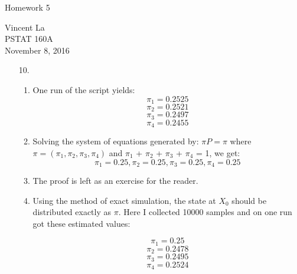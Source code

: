 \documentclass[11pt]{article}
\title{ }
\begin{document}
	\begin{center}	%
		\Large{Homework 5}	%
	\end{center}
	\begin{center}
		Vincent La \\
		PSTAT 160A \\
		November 8, 2016
	\end{center}

\begin{enumerate}

\item[10.]
	\begin{enumerate}
		\item One run of the script yields:
		\[\pi_1 =  0.2525\]
		\[\pi_2 = 0.2521\]
		\[\pi_3 = 0.2497\]
		\[\pi_4 = 0.2455\]
		\item Solving the system of equations generated by:
		$\pi P = \pi$ where $\pi = (\pi_1,\pi_2,\pi_3,\pi_4)$
		and $\pi_1$ + $\pi_2$ + $\pi_3$ + $\pi_4$ = 1, we get:
		\[\pi_1 = 0.25, \pi_2 = 0.25, \pi_3 = 0.25, \pi_4 = 0.25\]
		\item The proof is left as an exercise for the reader.
		\item Using the method of exact simulation, the state at $X_0$ should be distributed exactly as $\pi$. Here I collected 10000 samples and on one run got these estimated values:
	
		\[\pi_1 =  0.25\]
		\[\pi_2 = 0.2478\]
		\[\pi_3 = 0.2495\]
		\[\pi_4 = 0.2524\]
		
	\end{enumerate}
\end{enumerate}
\end{document}
